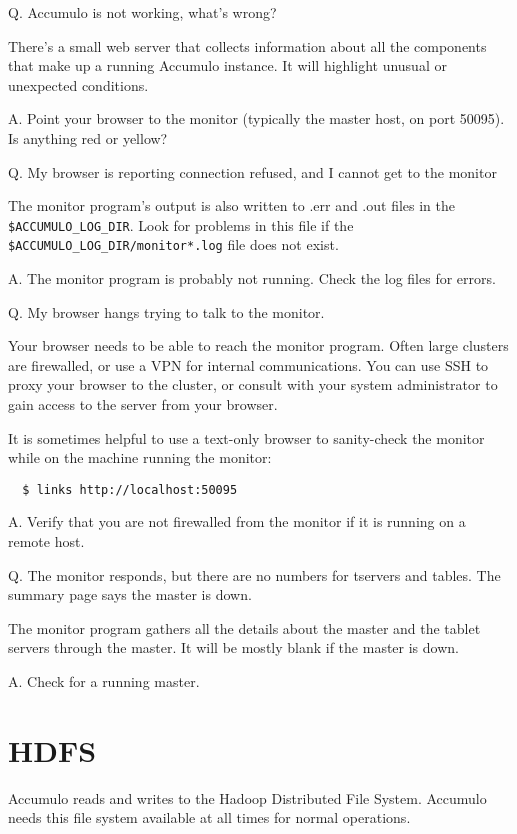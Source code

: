 Q. Accumulo is not working, what's wrong?

There's a small web server that collects information about all the
components that make up a running Accumulo instance. It will highlight
unusual or unexpected conditions.

A. Point your browser to the monitor (typically the master host, on port 50095).  Is anything red or yellow?

Q. My browser is reporting connection refused, and I cannot get to the monitor

The monitor program's output is also written to .err and .out files in
the \texttt{\$ACCUMULO\_LOG\_DIR}. Look for problems in this file if the
\texttt{\$ACCUMULO\_LOG\_DIR/monitor*.log} file does not exist.

A. The monitor program is probably not running.  Check the log files for errors.

Q. My browser hangs trying to talk to the monitor.

Your browser needs to be able to reach the monitor program.  Often
large clusters are firewalled, or use a VPN for internal
communications. You can use SSH to proxy your browser to the cluster,
or consult with your system administrator to gain access to the server
from your browser.

It is sometimes helpful to use a text-only browser to sanity-check the
monitor while on the machine running the monitor:

\begingroup\fontsize{8pt}{8pt}\selectfont\begin{verbatim}
  $ links http://localhost:50095
\end{verbatim}\endgroup

A. Verify that you are not firewalled from the monitor if it is running on a remote host.

Q. The monitor responds, but there are no numbers for tservers and tables.  The summary page says the master is down.

The monitor program gathers all the details about the master and the
tablet servers through the master. It will be mostly blank if the
master is down.

A. Check for a running master.

\section{HDFS}

Accumulo reads and writes to the Hadoop Distributed File System.
Accumulo needs this file system available at all times for normal operations.

